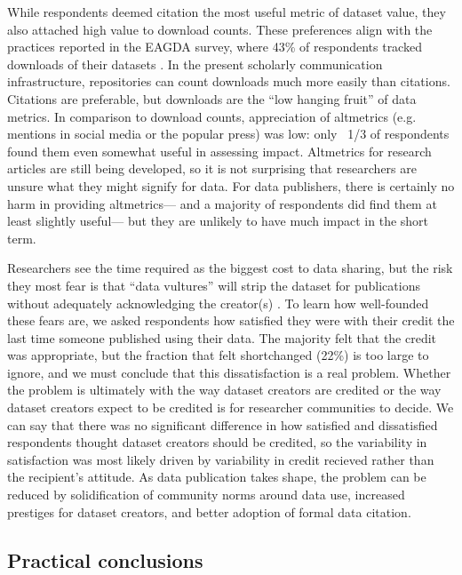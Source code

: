 \documentclass[10pt]{article}
\begin{document}
While respondents deemed citation the most useful metric of dataset value, they also attached high value to download counts.
These preferences align with the practices reported in the EAGDA survey, where 43\% of respondents tracked downloads of their datasets \cite{bobrow_establishing_2014}.
In the present scholarly communication infrastructure, repositories can count downloads much more easily than citations.
Citations are preferable, but downloads are the ``low hanging fruit'' of data metrics.
In comparison to download counts, appreciation of altmetrics (e.g. mentions in social media or the popular press) was low: only ~1/3 of respondents found them even somewhat useful in assessing impact.
Altmetrics for research articles are still being developed, so it is not surprising that researchers are unsure what they might signify for data.
For data publishers, there is certainly no harm in providing altmetrics--- and a majority of respondents did find them at least slightly useful--- but they are unlikely to have much impact in the short term.

Researchers see the time required as the biggest cost to data sharing, but the risk they most fear is that ``data vultures'' will strip the dataset for publications without adequately acknowledging the creator(s) \cite{kim_institutional_2012}.
To learn how well-founded these fears are, we asked respondents how satisfied they were with their credit the last time someone published using their data.
The majority felt that the credit was appropriate, but the fraction that felt shortchanged (22\%) is too large to ignore, and we must conclude that this dissatisfaction is a real problem.
Whether the problem is ultimately with the way dataset creators are credited or the way dataset creators expect to be credited is for researcher communities to decide.
We can say that there was no significant difference in how satisfied and dissatisfied respondents thought dataset creators should be credited, so the variability in satisfaction was most likely driven by variability in credit recieved rather than the recipient's attitude.
As data publication takes shape, the problem can be reduced by solidification of community norms around data use, increased prestiges for dataset creators, and better adoption of formal data citation.

\subsection*{Practical conclusions}
\end{document}
